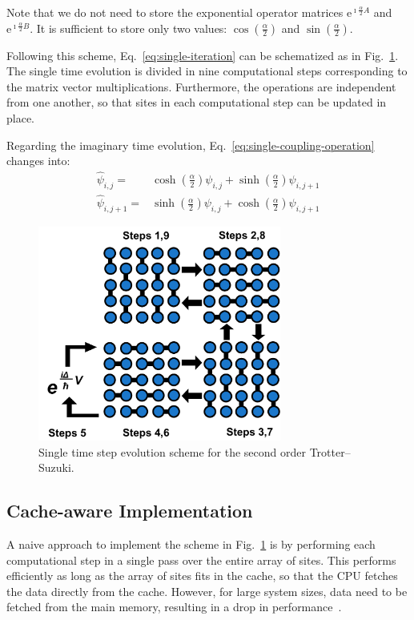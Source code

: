 Note that we do not need to store the exponential operator matrices $\mathrm{e}^{\imath \frac{\alpha}{2} A}$ and $\mathrm{e}^{\imath \frac{\alpha}{2} B}$. It is sufficient to store only two values: $ \cos\left(\frac{\alpha}{2}\right)$ and $\sin\left(\frac{\alpha}{2}\right)$.

Following this scheme, Eq.~\eqref{eq:single-iteration} can be schematized as in Fig.~\ref{fig:scheme-iteration}. The single time evolution is divided in nine computational steps corresponding to the matrix vector multiplications. Furthermore, the operations are independent from one another, so that sites in each computational step can be updated in place.

Regarding the imaginary time evolution, Eq.~\eqref{eq:single-coupling-operation} changes into:
\begin{align} \label{eq:single-coupling-operation-imag}
\hat{\psi}_{i,j} = & \cosh\left(\frac{\alpha}{2}\right) \psi_{i,j} + \sinh\left(\frac{\alpha}{2}\right) \psi_{i,j+1} \nonumber \\ 
\hat{\psi}_{i,j+1} = & \sinh\left(\frac{\alpha}{2}\right) \psi_{i,j} + \cosh\left(\frac{\alpha}{2}\right) \psi_{i,j+1} 
\end{align}
\begin{figure} 
   \centering
   \includegraphics[width=8cm]{Figs/Single_time_step_evolution.png}
   \caption{Single time step evolution scheme for the second order Trotter--Suzuki.} \label{fig:scheme-iteration}
\end{figure}

\subsection{Cache-aware Implementation}
A naive approach to implement the scheme in Fig.~\ref{fig:scheme-iteration} is by performing each computational step in a single pass over the entire array of sites. This performs efficiently as long as the array of sites fits in the cache, so that the CPU fetches the data directly from the cache. However, for large system sizes, data need to be fetched from the main memory, resulting in a drop in performance~\citep{bederian2011boosting}. 

